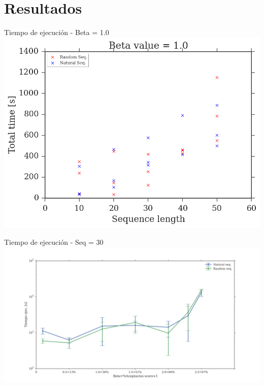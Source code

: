 \documentclass{beamer}
\begin{document}
\section{Resultados}
 

\begin{frame}{Tiempo de ejecución - Beta = 1.0}
\includegraphics[width=\textwidth,height=0.8\textheight]{largo-beta.png}
\end{frame}


\begin{frame}{Tiempo de ejecución - Seq = 30}
\includegraphics[width=\textwidth,height=0.85\textheight]{beta-time.png}
\end{frame}
\end{document}
